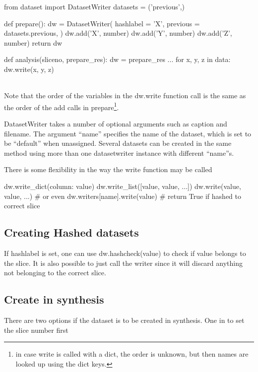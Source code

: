 \begin{python}
from dataset import DatasetWriter
datasets = ('previous',)

def prepare():
  dw = DatasetWriter(
    hashlabel = 'X',
    previous = datasets.previous,
  )
  dw.add('X', number)
  dw.add('Y', number)
  dw.add('Z', number)
  return dw

def analysis(sliceno, prepare_res):
  dw = prepare_res
  ...
  for x, y, z in data:
    dw.write(x, y, z)
\end{python}
\\
Note that the order of the variables in the dw.write function call is
the same as the order of the add calls in prepare\footnote{in case
  write is called with a dict, the order is unknown, but then names
  are looked up using the dict keys.}.

DatasetWriter takes a number of optional arguments such as caption and
filename.  The argument ``name'' specifies the name of the dataset,
which is set to be ``default'' when unassigned.  Several datasets can
be created in the same method using more than one datasetwriter
instance with different ``name''s.

There is some flexibility in the way the write function may be called

\begin{python}
  dw.write_dict({column: value})
  dw.write_list([value, value, ...])
  dw.write(value, value, ...)
  # or even
  dw.writers[name].write(value)  # return True if hashed to correct slice
\end{python}



\subsection{Creating Hashed datasets}

If hashlabel is set, one can use dw.hashcheck(value) to check if value
belongs to the slice.  It is also possible to just call the writer
since it will discard anything not belonging to the correct slice.



\subsection{Create in synthesis}

There are two options if the dataset is to be created in synthesis.
One in to set the slice number first

